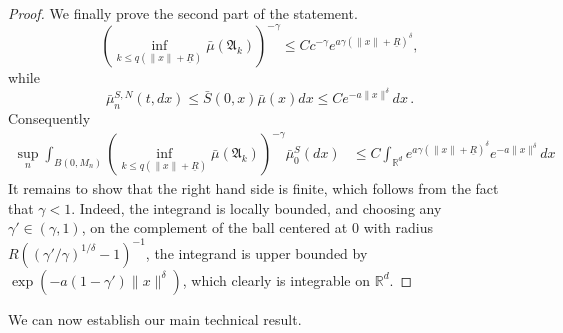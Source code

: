\documentclass[notitlepage,reqno,11pt]{amsart}
\numberwithin{equation}{section}
\def\R{\mathbb{R}}
\begin{document}
\begin{proof}
We finally prove the second part of the statement.
\[ \left(\inf_{k\le q(\|x\|+\underline{R})}\bar{\mu}(\mathfrak{A}_k)\right)^{-\gamma}\le Cc^{-\gamma}e^{a\gamma(\|x\|+\underline{R})^{\delta}},\]
while
\[\bar{\mu}^{S,N}_n(t,dx)\le \bar{S}(0,x)\bar{\mu}(x)dx\le Ce^{-a\|x\|^\delta}dx\,.\]
Consequently
\begin{align*}
\sup_n\int_{B(0,M_n)}\left(\inf_{k\le q(\|x\|+\underline{R})}\bar{\mu}(\mathfrak{A}_k)\right)^{-\gamma}\bar{\mu}^{S}_0(dx)
&\le C\int_{\R^d}e^{a\gamma(\|x\|+\underline{R})^{\delta}}e^{-a\|x\|^\delta}dx
\end{align*}
It remains to show that the right hand side is finite, which follows from the fact that $\gamma<1$. 
Indeed, the integrand is locally bounded, and choosing any $\gamma'\in(\gamma,1)$, on the complement of the ball centered at $0$ with radius
$R\left((\gamma'/\gamma)^{1/\delta}-1\right)^{-1}$, the integrand is upper bounded by $\exp(-a(1-\gamma')\|x\|^\delta)$, which clearly is integrable on $\R^d$.
\end{proof}

We can now establish our main technical result.
\end{document}
